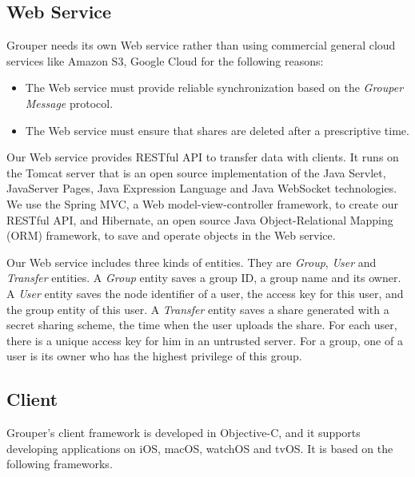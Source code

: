 \documentclass[twocolumn,10pt]{article}
\begin{document}
\subsection{Web Service}

Grouper needs its own Web service rather than using commercial general cloud services like Amazon S3, Google Cloud for the following reasons:

\begin{itemize}
	\setlength{\itemsep}{1pt}
	\setlength{\parskip}{0pt}
	\setlength{\parsep}{0pt}
	\item The Web service must provide reliable synchronization based on the \emph{Grouper Message} protocol.
	\item The Web service must ensure that shares are deleted after a prescriptive time.
\end{itemize}

Our Web service provides RESTful API to transfer data with clients. 
It runs on the Tomcat server that is an open source implementation of the Java Servlet, JavaServer Pages, Java Expression Language and Java WebSocket technologies. 
We use the Spring MVC, a  Web model-view-controller framework, to create our RESTful API, and Hibernate, an open source Java Object-Relational Mapping (ORM) framework, to save and operate objects in the Web service. 

Our Web service includes three kinds of entities. 
They are \emph{Group}, \emph{User} and \emph{Transfer} entities. 
A \emph{Group} entity saves a group ID, a group name and its owner. 
A \emph{User} entity saves the node identifier of a user, the access key for this user, and the group entity of this user. 
A \emph{Transfer} entity saves a share generated with a secret sharing scheme, the time when the user uploads the share. 
For each user, there is a unique access key for him in an untrusted server. For a group, one of a user is its owner who has the highest privilege of this group.

\subsection{Client}

Grouper's client framework is developed in Objective-C, and it supports developing applications on iOS, macOS, watchOS and tvOS.
It is based on the following frameworks.   
\end{document}
